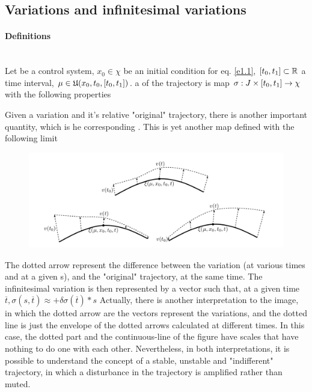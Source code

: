 \subsection{Variations and infinitesimal variations}


\paragraph{Definitions}\mbox{}\\
Let \controlSystem be a control system, $x_0\in\chi$ be an initial condition for eq. \ref{e1.1}, $[t_0,t_1]\subset\mathbb{R}$ a time interval, $\mu\in\mathfrak{U}(x_0,t_0,[t_0,t_1])$. a  of the trajectory \trajWinCond{\cdot} is map $\sigma:J\times[t_0,t_1]\rightarrow\chi$ with the following properties 

Given a variation and it's relative "original" trajectory, there is another important quantity, which is he corresponding . This is yet another map defined with the following limit
\begin{figure}[H]
	\includegraphics[width=\linewidth]{imgs/variations.png}
	\caption{}
	\label{fig-variations}
\end{figure}
The dotted arrow represent the difference between the variation (at various times and at a given s), and the "original" trajectory, at the same time. The infinitesimal variation is then represented by a vector such that, at a given time $\overline{t},\sigma(s,\overline{t})\approx$$+\delta\sigma(\overline{t})*s$
Actually, there is another interpretation to the image, in which the dotted arrow are the vectors represent the  variations, and the dotted line is just the envelope of the dotted arrows calculated at different times. In this case, the dotted part and the continuous-line of the figure have scales that have nothing to do one with each other. Nevertheless, in both interpretations, it is possible to understand the concept of a stable, unstable and "indifferent" trajectory, in which a disturbance in the trajectory is amplified rather than muted.


